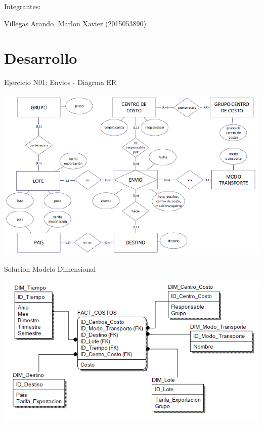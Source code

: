 \documentclass[12pt,letterpaper]{article}
\begin{document}
\begin{titlepage}
\begin{center}
\vspace*{0.2in}
\vspace*{0.1in}
\begin{large}
Integrantes: \\
\begin{flushleft}
Villegas Arando, Marlon Xavier 		\hfill	(2015053890) \\

\end{flushleft}
\end{large}
\end{center}

\end{titlepage}

 \newpage

\section{Desarrollo} 

Ejercicio N01:  Envios - Diagrma ER

\begin{center}
\includegraphics[width=17cm]{IMG/er1.png} 
\end{center}

Solucion
Modelo Dimensional
\begin{center}
\includegraphics[width=17cm]{IMG/ejer1.png} 
\end{center}
 \newpage
\end{document}
